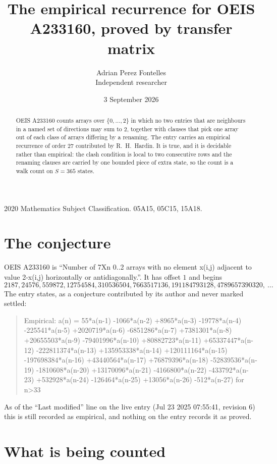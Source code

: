 \documentclass[11pt,a4paper]{article}
\title{The empirical recurrence for OEIS A233160, proved by transfer matrix}
\author{Adrian Perez Fontelles\\ \small Independent researcher}
\date{3 September 2026}
\theoremstyle{plain}
\theoremstyle{definition}
\begin{document}
\maketitle

\begin{abstract}
OEIS A233160 counts arrays over $\{0,\dots,2\}$ in which no two entries that are neighbours in
a named set of directions may sum to $2$, together with clauses that pick one array out of
each class of arrays differing by a renaming. The entry carries an empirical recurrence of
order $27$ contributed by R.~H.~Hardin. It is true, and it is decidable rather than
empirical: the clash condition is local to two consecutive rows and the renaming clauses are
carried by one bounded piece of extra state, so the count is a walk count on $S=365$ states.
\end{abstract}

\noindent\small 2020 Mathematics Subject Classification. 05A15, 05C15, 15A18.\normalsize

\section{The conjecture}

OEIS A233160 is ``Number of 7Xn 0..2 arrays with no element x(i,j) adjacent to value 2-x(i,j) horizontally or antidiagonally.''. It has offset $1$ and begins
\[
2187, 24576, 559872, 12754584, 310536504, 7663517136, 191184793128, 4789657390320,\ \dots
\]
The entry states, as a conjecture contributed by its author and never marked settled:
\begin{quote}
Empirical: a(n) = 55*a(n-1) -1066*a(n-2) +8965*a(n-3) -19778*a(n-4) -225541*a(n-5) +2020719*a(n-6) -6851286*a(n-7) +7381301*a(n-8) +20655503*a(n-9) -79401996*a(n-10) +80882723*a(n-11) +65337447*a(n-12) -222811374*a(n-13) +135953338*a(n-14) +120111164*a(n-15) -197698384*a(n-16) +43440564*a(n-17) +76879396*a(n-18) -52839536*a(n-19) -1810608*a(n-20) +13170096*a(n-21) -4166800*a(n-22) -433792*a(n-23) +532928*a(n-24) -126464*a(n-25) +13056*a(n-26) -512*a(n-27) for n>33
\end{quote}
As of the ``Last modified'' line on the live entry (Jul 23 2025 07:55:41, revision 6) this is still
recorded as empirical, and nothing on the entry records it as proved.

\section{What is being counted}
\end{document}
